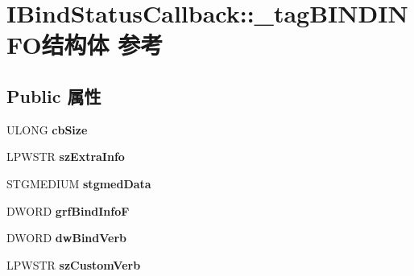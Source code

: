 \hypertarget{struct_i_bind_status_callback_1_1__tag_b_i_n_d_i_n_f_o}{}\section{I\+Bind\+Status\+Callback\+:\+:\+\_\+tag\+B\+I\+N\+D\+I\+N\+F\+O结构体 参考}
\label{struct_i_bind_status_callback_1_1__tag_b_i_n_d_i_n_f_o}
\subsection*{Public 属性}
\begin{DoxyCompactItemize}
\item 
\mbox{\label{struct_i_bind_status_callback_1_1__tag_b_i_n_d_i_n_f_o_af04fe205b032138a0363d4202546373e}} 
U\+L\+O\+NG {\bfseries cb\+Size}
\item 
\mbox{\label{struct_i_bind_status_callback_1_1__tag_b_i_n_d_i_n_f_o_a930850cc73d57c1b531ff19daa32cea8}} 
L\+P\+W\+S\+TR {\bfseries sz\+Extra\+Info}
\item 
\mbox{\label{struct_i_bind_status_callback_1_1__tag_b_i_n_d_i_n_f_o_a788c42e1f3bab58bed54f806ffa68d3b}} 
S\+T\+G\+M\+E\+D\+I\+UM {\bfseries stgmed\+Data}
\item 
\mbox{\label{struct_i_bind_status_callback_1_1__tag_b_i_n_d_i_n_f_o_a5477ada6fd42ba8836188932db7cea46}} 
D\+W\+O\+RD {\bfseries grf\+Bind\+InfoF}
\item 
\mbox{\label{struct_i_bind_status_callback_1_1__tag_b_i_n_d_i_n_f_o_a1e877bde810e4c4e42a0a9d490a0bd1b}} 
D\+W\+O\+RD {\bfseries dw\+Bind\+Verb}
\item 
\mbox{\label{struct_i_bind_status_callback_1_1__tag_b_i_n_d_i_n_f_o_a8f7a2965c1731adb9cb9bc0fb27cf210}} 
L\+P\+W\+S\+TR {\bfseries sz\+Custom\+Verb}
\item 
\mbox{\label{struct_i_bind_status_callback_1_1__tag_b_i_n_d_i_n_f_o_a95bf5736502e7da84111800ee9058a41}} 

\end{DoxyCompactItemize}
